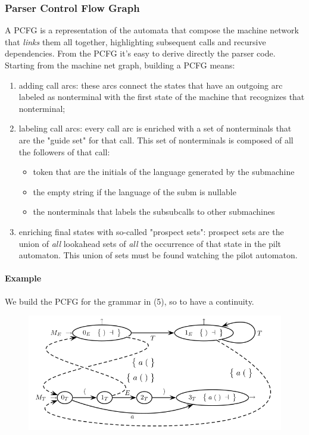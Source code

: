 \documentclass[10pt,a4paper]{article}
\begin{document}
				\subsubsection{Parser Control Flow Graph}
					A PCFG is a representation of the automata that compose the machine network that \emph{links} them all together, highlighting subsequent calls and recursive dependencies. From the PCFG it's easy to derive directly the parser code.\\
					Starting from the machine net graph, building a PCFG means:
					\begin{enumerate}
						\item adding call arcs: these arcs connect the states that have an outgoing arc labeled as nonterminal with the first state of the machine that recognizes that nonterminal;
						\item labeling call arcs: every call arc is enriched with a set of nonterminals that are the "guide set" for that call. This set of nonterminals is composed of all the followers of that call:
							\begin{itemize}
								\item token that are the initials of the language generated by the submachine
								\item the empty string if the language of the subm is nullable
								\item the nonterminals that labels the subsubcalls to other submachines
							\end{itemize}
						\item enriching final states with so-called "prospect sets": prospect sets are the union of \emph{all} lookahead sets of \emph{all} the occurrence of that state in the pilt automaton. This union of sets must be found watching the pilot automaton. 
					\end{enumerate}
					
					\paragraph{Example}
						We build the PCFG for the grammar in (5), so to have a continuity.
						\begin{figure}[H]
							\centering
							\includegraphics[width = \textwidth]{./images/PCFG.png}
						\end{figure}
				 
\end{document}
